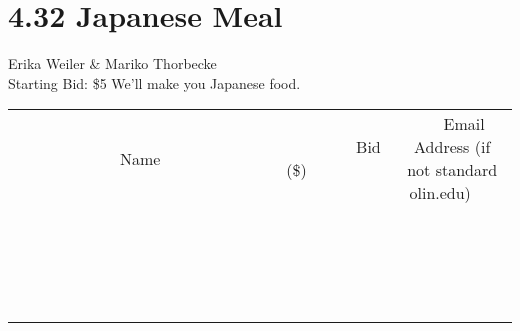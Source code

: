 \documentclass[11pt]{article}
\begin{document}
\section*{4.32 Japanese Meal}
Erika Weiler \& Mariko Thorbecke
\\
Starting Bid: \$5
\newline
We'll make you Japanese food.
\\[3ex]
\begin{tabular}{c c c}
~~~~~~~~~~~~~Name~~~~~~~~~~~~~ & ~~~~~~~~~Bid (\$)~~~~~~~~~  & ~~~Email Address (if not standard olin.edu)~~~\\
 & & \\
\hline
 & & \\
\hline
 & & \\
\hline
 & & \\
\hline
 & & \\
\hline
 & & \\
\hline
 & & \\
\hline
 & & \\
\hline
 & & \\
\hline
 & & \\
\hline
 & & \\
\hline
 & & \\
\hline
 & & \\
\hline
 & & \\
\hline
 & & \\
\hline
 & & \\
\hline
 & & \\
\hline
 & & \\
\hline
 & & \\
\hline
\end{tabular}
\newpage
\end{document}
